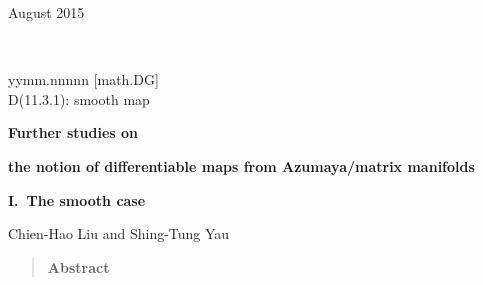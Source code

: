 \documentclass[11pt]{article}
\numberwithin{equation}{subsection}
\begin{document}
\enlargethispage{24cm}

\begin{titlepage}

$ $

\vspace{-1.5cm} %

\noindent\hspace{-1cm}
\parbox{6cm}{\small August 2015}\
   \hspace{7cm}\
   \parbox[t]{6cm}{yymm.nnnnn [math.DG] \\
                D(11.3.1): smooth map  \\
				}

\vspace{2cm}

\centerline{\large\bf
 Further studies on}
\vspace{1ex}
\centerline{\large\bf
 the notion of differentiable maps from Azumaya/matrix manifolds}
\vspace{1ex}
\centerline{\large\bf
 I.\ The smooth case}




\vspace{3em}

\centerline{\large
  Chien-Hao Liu
            \hspace{1ex} and \hspace{1ex}
  Shing-Tung Yau
}

\vspace{4em}

\begin{quotation}
\centerline{\bf Abstract}

\vspace{0.3cm}


\end{quotation}
\end{titlepage}
\end{document}
